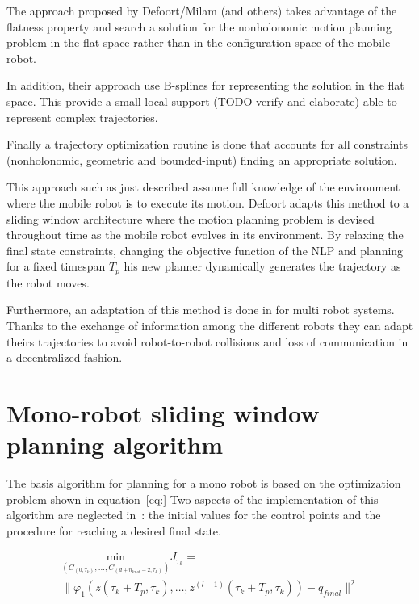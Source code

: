 \documentclass[eprint]{actapoly}
\begin{document}
The approach proposed by Defoort/Milam (and others) takes advantage of the flatness property and search a solution for
the nonholonomic motion planning problem in the flat space rather than in the configuration space of the mobile robot.

In addition, their approach use B-splines for representing the solution in the flat space. This provide a small local support (TODO verify and elaborate) able to represent
complex trajectories.

Finally a trajectory optimization routine is done that accounts for all constraints (nonholonomic, geometric and bounded-input) finding an appropriate
solution.

This approach such as just described assume full knowledge of the environment where the mobile robot is to execute its motion. Defoort adapts this
method to a sliding window architecture where the motion planning problem is devised throughout time as the mobile robot evolves in its environment.
By relaxing the final state constraints, changing the objective function of the NLP and planning for a fixed timespan $T_p$ his new planner
dynamically generates the trajectory as the robot moves.

Furthermore, an adaptation of this method is done in \cite{Defoort2007a} for multi robot systems. Thanks to the exchange of information
among the different robots they can adapt theirs trajectories to avoid robot-to-robot collisions and loss of communication in a decentralized fashion.


\section{Mono-robot sliding window planning algorithm}


The basis algorithm for planning for a mono robot is based on the optimization problem shown in equation~\ref{eq:}
Two aspects of the implementation of this algorithm are neglected in~\cite{Defoort2007a}: the initial values for
the control points and the procedure for reaching a desired final state.

\begin{align}
	\underset{(C_{(0,\tau_k)},\dotsc,C_{(d+n_{knot}-2,\tau_k)})}{\mathrm{min}} J_{\tau_k} =
\nonumber\\
	\|\varphi_1(z(\tau_k+T_p,\tau_k),\dotsc,z^{(l-1)}(\tau_k+T_p,\tau_k))-q_{final}\|^2
\end{align}
\end{document}
